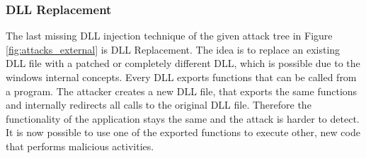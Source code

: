\subsubsection{DLL Replacement}
The last missing DLL injection technique of the given attack tree in Figure \ref{fig:attacks_external} is DLL Replacement. The idea is to replace an existing DLL file with a patched or completely different DLL, which is possible due to the windows internal concepts. Every DLL exports functions that can be called from a program. The attacker creates a new DLL file, that exports the same functions and internally redirects all calls to the original DLL file. Therefore the functionality of the application stays the same and the attack is harder to detect. It is now possible to use one of the exported functions to execute other, new code that performs malicious activities.